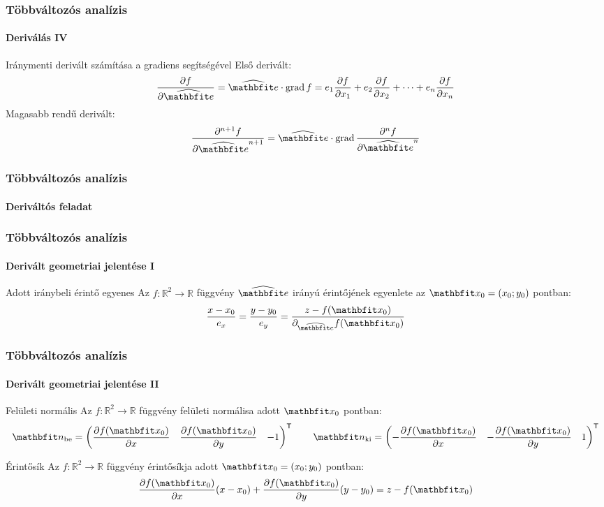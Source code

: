 \begin{frame}
  \frametitle{Többváltozós analízis}
  \framesubtitle{Deriválás IV}

  \begin{block}{Iránymenti derivált számítása a gradiens segítségével}
    Első derivált:
    \[
      \pdv{f}{\uvec e}
      = \uvec e \cdot \grad f
      = e_1 \pdv{f}{x_1} + e_2 \pdv{f}{x_2} + \dots + e_n \pdv{f}{x_n}
    \]
    Magasabb rendű derivált:
    \[
      \pdv[order={n+1}]{f}{\uvec e}
      = \uvec e \cdot \grad \pdv[order={n}]{f}{\uvec e}
    \]
  \end{block}
\end{frame}

\begin{frame}
  \frametitle{Többváltozós analízis}
  \framesubtitle{Deriváltós feladat}

  
\end{frame}

\begin{frame}
  \frametitle{Többváltozós analízis}
  \framesubtitle{Derivált geometriai jelentése I}

  \begin{block}{Adott iránybeli érintő egyenes}
    Az $f: \mathbb R^2 \rightarrow \mathbb R$ függvény $\uvec e$ irányú
    érintőjének egyenlete az $\rvec x_0 = (x_0; y_0)$ pontban:
    \[
      \frac{x - x_0}{e_x} =
      \frac{y - y_0}{e_y} =
      \frac{z - f(\rvec x_0)}{\partial_{\uvec e} f(\rvec x_0)}
    \]
  \end{block}
\end{frame}

\begin{frame}
  \frametitle{Többváltozós analízis}
  \framesubtitle{Derivált geometriai jelentése II}

  \begin{block}{Felületi normális}
    \newcommand\ds{\displaystyle}
    Az $f: \mathbb R^2 \rightarrow \mathbb R$ függvény felületi normálisa
    adott $\rvec x_0$ pontban:
    \[
      \rvec n_\text{be} = \begin{pmatrix}
        \ds\pdv{f(\rvec x_0)}{x} & \ds\pdv{f(\rvec x_0)}{y} & -1
      \end{pmatrix}^{\mathsf T}
      \qquad
      \rvec n_\text{ki} = \begin{pmatrix}
        -\ds\pdv{f(\rvec x_0)}{x} & -\ds\pdv{f(\rvec x_0)}{y} & 1
      \end{pmatrix}^{\mathsf T}
    \]
  \end{block}

  \begin{block}{Érintősík}
    Az $f: \mathbb R^2 \rightarrow \mathbb R$ függvény érintősíkja
    adott $\rvec x_0 = (x_0; y_0)$ pontban:
    \[
      \pdv{f(\rvec x_0)}{x} (x - x_0) +
      \pdv{f(\rvec x_0)}{y} (y - y_0) =
      z - f(\rvec x_0)
    \]
  \end{block}
\end{frame}

